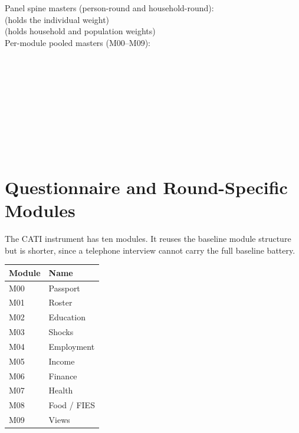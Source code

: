 \begin{refbox}
Panel spine masters (person-round and household-round):\\
 (holds the individual weight)\\
 (holds household and population weights)\\[4pt]
Per-module pooled masters (M00--M09):\\
\\
\\
\\
\\
\\
\\
\\
\\
\\
\end{refbox}

\section{Questionnaire and Round-Specific Modules}

The CATI instrument has ten modules. It reuses the baseline module structure but is
shorter, since a telephone interview cannot carry the full baseline battery.

\begin{center}
\begin{tabular}{@{}ll@{}}
\toprule
\textbf{Module} & \textbf{Name} \\
\midrule
M00 & Passport \\
M01 & Roster \\
M02 & Education \\
M03 & Shocks \\
M04 & Employment \\
M05 & Income \\
M06 & Finance \\
M07 & Health \\
M08 & Food / FIES \\
M09 & Views \\
\bottomrule
\end{tabular}
\end{center}

